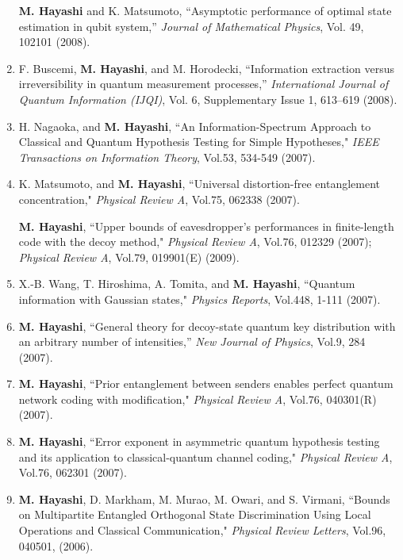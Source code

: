 \documentclass[a4paper,12pt,oneside]{article}
\begin{document}
\begin{enumerate}
	\textbf{M. Hayashi} and K. Matsumoto, 
``Asymptotic performance of optimal state estimation in qubit system,'' 
{\em Journal of Mathematical Physics}, Vol. 49, 102101 (2008).

\item F. Buscemi, \textbf{M. Hayashi}, and M. Horodecki, 
``Information extraction versus irreversibility in quantum measurement processes,''
{\em International Journal of Quantum Information (IJQI)}, 
Vol. 6, Supplementary Issue 1, 613--619 (2008). 

\item
H. Nagaoka, and \textbf{M. Hayashi}, ``An Information-Spectrum Approach to Classical and Quantum Hypothesis Testing for Simple Hypotheses," 
{\em IEEE Transactions on Information Theory}, Vol.53, 534-549 (2007).

\item
K. Matsumoto, and \textbf{M. Hayashi}, ``Universal distortion-free entanglement concentration," 
{\em Physical Review A}, Vol.75, 062338 (2007).

\textbf{M. Hayashi}, ``Upper bounds of eavesdropper's performances in finite-length code with the decoy method," 
{\em Physical Review A}, Vol.76, 012329 (2007); 
{\em Physical Review A}, Vol.79, 019901(E) (2009).

\item
X.-B. Wang, T. Hiroshima, A. Tomita, and \textbf{M. Hayashi}, ``Quantum information with Gaussian states," 
{\em Physics Reports}, Vol.448, 1-111 (2007).

\item
\textbf{M. Hayashi}, ``General theory for decoy-state quantum key distribution with an arbitrary number of intensities,'' 
{\em New Journal of Physics}, Vol.9, 284 (2007).

\item
\textbf{M. Hayashi}, ``Prior entanglement between senders enables perfect quantum network coding with modification," 
{\em Physical Review A}, Vol.76, 040301(R) (2007).

\item
\textbf{M. Hayashi}, ``Error exponent in asymmetric quantum hypothesis testing and its application to classical-quantum channel coding,"
{\em Physical Review A}, Vol.76, 062301 (2007).

\item 
\textbf{M. Hayashi}, D. Markham, M. Murao, M. Owari, and S. Virmani, 
``Bounds on Multipartite Entangled Orthogonal State Discrimination Using Local Operations and Classical Communication," 
{\em Physical Review Letters}, Vol.96, 040501, (2006).


\end{enumerate}
\end{document}

